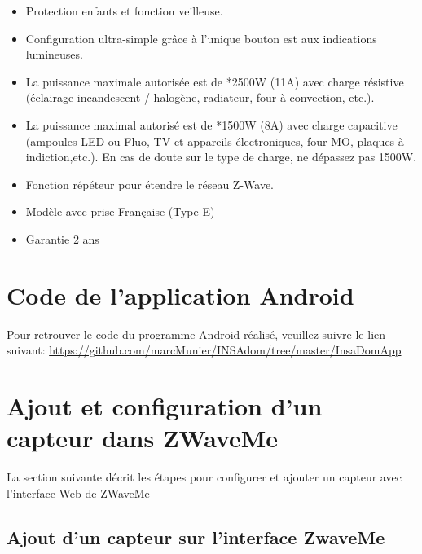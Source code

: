 \begin{itemize}

\item Protection enfants et fonction veilleuse.


\item Configuration ultra-simple grâce à l'unique bouton est aux indications lumineuses.


\item La puissance maximale autorisée est de *2500W (11A) avec charge résistive (éclairage incandescent / halogène, radiateur, four à convection, etc.).
    

\item La puissance maximal autorisé est de *1500W (8A) avec charge capacitive (ampoules LED ou Fluo, TV et appareils électroniques, four MO, plaques à indiction,etc.). En cas de doute sur le type de charge, ne dépassez pas 1500W.


\item Fonction répéteur pour étendre le réseau Z-Wave.


\item Modèle avec prise Française (Type E)


\item Garantie 2 ans 

\end{itemize}
\section{Code de l'application Android}

Pour retrouver le code du programme Android réalisé, veuillez suivre le lien suivant:  \url{https://github.com/marcMunier/INSAdom/tree/master/InsaDomApp}

\newpage
\section{ Ajout et configuration d'un capteur dans ZWaveMe}
\clearpage

La section suivante décrit les étapes pour configurer et ajouter un capteur avec l'interface Web de ZWaveMe


\subsection{Ajout d'un capteur sur l'interface ZwaveMe}

